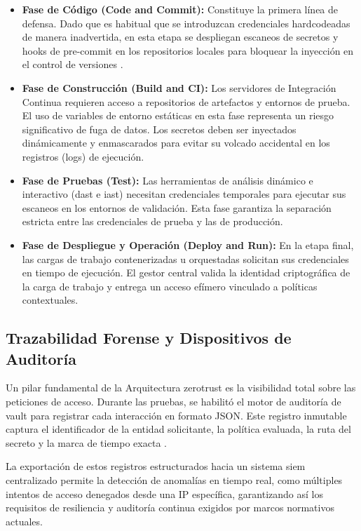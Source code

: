 \documentclass[runningheads]{llncs}
\begin{document}
\begin{itemize}
    \item \textbf{Fase de Código (Code and Commit):} Constituye la primera línea de defensa. Dado que es habitual que se introduzcan credenciales hardcodeadas de manera inadvertida, en esta etapa se despliegan escaneos de secretos y hooks de pre-commit en los repositorios locales para bloquear la inyección en el control de versiones \parencite{owasp_secrets_management_cheat_sheet,github_secret_scanning}.
    \item \textbf{Fase de Construcción (Build and CI):} Los servidores de Integración Continua requieren acceso a repositorios de artefactos y entornos de prueba. El uso de variables de entorno estáticas en esta fase representa un riesgo significativo de fuga de datos. Los secretos deben ser inyectados dinámicamente y enmascarados para evitar su volcado accidental en los registros (logs) de ejecución.
    \item \textbf{Fase de Pruebas (Test):} Las herramientas de análisis dinámico e interactivo (\gls{dast} e \gls{iast}) necesitan credenciales temporales para ejecutar sus escaneos en los entornos de validación. Esta fase garantiza la separación estricta entre las credenciales de prueba y las de producción.
    \item \textbf{Fase de Despliegue y Operación (Deploy and Run):} En la etapa final, las cargas de trabajo contenerizadas u orquestadas solicitan sus credenciales en tiempo de ejecución. El gestor central valida la identidad criptográfica de la carga de trabajo y entrega un acceso efímero vinculado a políticas contextuales.
\end{itemize}

\subsection{Trazabilidad Forense y Dispositivos de Auditoría}
Un pilar fundamental de la Arquitectura \gls{zerotrust} es la visibilidad total sobre las peticiones de acceso. Durante las pruebas, se habilitó el motor de auditoría de \gls{vault} para registrar cada interacción en formato JSON. Este registro inmutable captura el identificador de la entidad solicitante, la política evaluada, la ruta del secreto y la marca de tiempo exacta \parencite{vault_audit_devices}.

La exportación de estos registros estructurados hacia un sistema \gls{siem} centralizado permite la detección de anomalías en tiempo real, como múltiples intentos de acceso denegados desde una IP específica, garantizando así los requisitos de resiliencia y auditoría continua exigidos por marcos normativos actuales.
\end{document}
